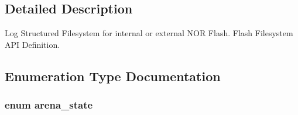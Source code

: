 \subsection{\-Detailed \-Description}
\-Log \-Structured \-Filesystem for internal or external \-N\-O\-R \-Flash. \-Flash \-Filesystem \-A\-P\-I \-Definition. 

\subsection{\-Enumeration \-Type \-Documentation}
\hypertarget{group___p_i_o_s___f_l_a_s_h_f_s_gaa936149cfd5559190d20879c10e0fcee}{
\subsubsection[{arena\-\_\-state}]{\setlength{\rightskip}{0pt plus 5cm}enum {\bf arena\-\_\-state}}}\label{group___p_i_o_s___f_l_a_s_h_f_s_gaa936149cfd5559190d20879c10e0fcee}
